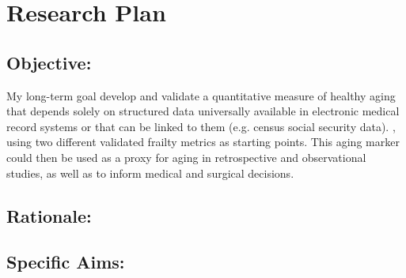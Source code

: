 \section{Research Plan }\label{research-plan}


\subsection{Objective:}\label{objective}
  
My long-term goal develop and validate a quantitative measure of healthy aging that depends solely on structured data universally available in electronic medical record systems or that can be linked to them (e.g. census social security data). ,
using two different validated frailty metrics as starting points. This
aging marker could then be used as a proxy for aging in retrospective
and observational studies, as well as to inform medical and surgical
decisions.


\subsection{Rationale:}\label{rationale}

\subsection{Specific Aims:}\label{specific-aims}
